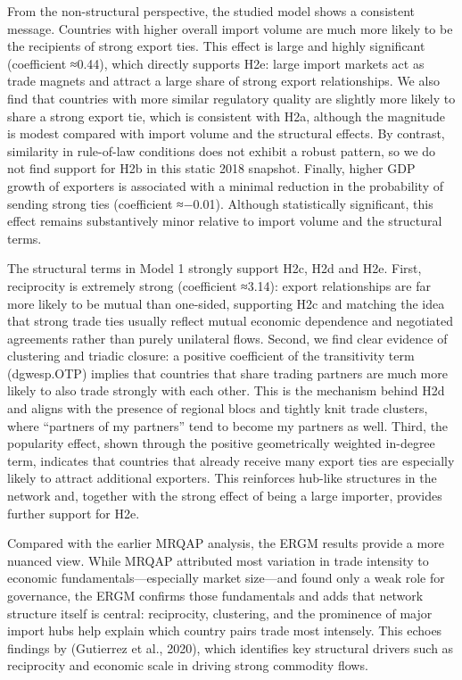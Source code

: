 \documentclass[
]{article}
\begin{document}
From the non-structural perspective, the studied model shows a
consistent message. Countries with higher overall import volume are much
more likely to be the recipients of strong export ties. This effect is
large and highly significant (coefficient ≈0.44), which directly
supports H2e: large import markets act as trade magnets and attract a
large share of strong export relationships. We also find that countries
with more similar regulatory quality are slightly more likely to share a
strong export tie, which is consistent with H2a, although the magnitude
is modest compared with import volume and the structural effects. By
contrast, similarity in rule-of-law conditions does not exhibit a robust
pattern, so we do not find support for H2b in this static 2018 snapshot.
Finally, higher GDP growth of exporters is associated with a minimal
reduction in the probability of sending strong ties (coefficient
≈−0.01). Although statistically significant, this effect remains
substantively minor relative to import volume and the structural terms.

The structural terms in Model 1 strongly support H2c, H2d and H2e.
First, reciprocity is extremely strong (coefficient ≈3.14): export
relationships are far more likely to be mutual than one-sided,
supporting H2c and matching the idea that strong trade ties usually
reflect mutual economic dependence and negotiated agreements rather than
purely unilateral flows. Second, we find clear evidence of clustering
and triadic closure: a positive coefficient of the transitivity term
(dgwesp.OTP) implies that countries that share trading partners are much
more likely to also trade strongly with each other. This is the
mechanism behind H2d and aligns with the presence of regional blocs and
tightly knit trade clusters, where ``partners of my partners'' tend to
become my partners as well. Third, the popularity effect, shown through
the positive geometrically weighted in-degree term, indicates that
countries that already receive many export ties are especially likely to
attract additional exporters. This reinforces hub-like structures in the
network and, together with the strong effect of being a large importer,
provides further support for H2e.

Compared with the earlier MRQAP analysis, the ERGM results provide a
more nuanced view. While MRQAP attributed most variation in trade
intensity to economic fundamentals---especially market size---and found
only a weak role for governance, the ERGM confirms those fundamentals
and adds that network structure itself is central: reciprocity,
clustering, and the prominence of major import hubs help explain which
country pairs trade most intensely. This echoes findings by (Gutierrez
et al., 2020), which identifies key structural drivers such as
reciprocity and economic scale in driving strong commodity flows.
\end{document}
